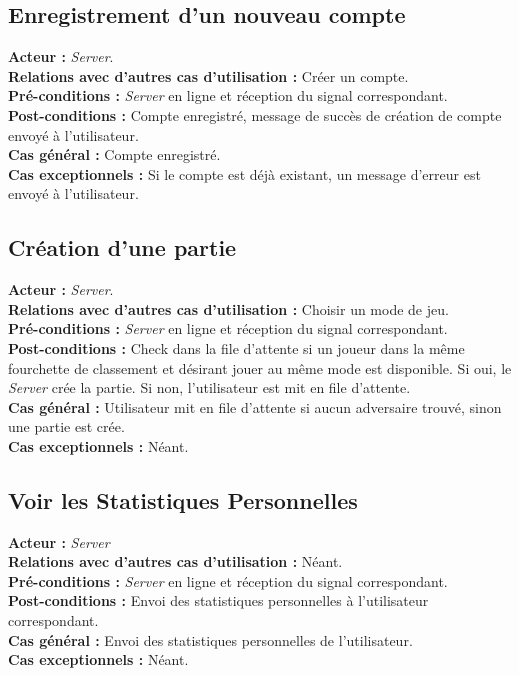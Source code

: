 \documentclass[10pt, a4paper]{article}
\begin{document}
\subsection{Enregistrement d'un nouveau compte}
\textbf{Acteur :} \textit{Server}. \\
\textbf{Relations avec d'autres cas d'utilisation :} Créer un compte. \\
\textbf{Pré-conditions :} \textit{Server} en ligne et réception du signal correspondant. \\
\textbf{Post-conditions :} Compte enregistré, message de succès de création de compte envoyé à l'utilisateur. \\
\textbf{Cas général :} Compte enregistré. \\
\textbf{Cas exceptionnels :} Si le compte est déjà existant, un message d'erreur est envoyé à l'utilisateur. \\

\subsection{Création d'une partie}
\textbf{Acteur :} \textit{Server}. \\
\textbf{Relations avec d'autres cas d'utilisation :} Choisir un mode de jeu. \\
\textbf{Pré-conditions :} \textit{Server} en ligne et réception du signal correspondant. \\
\textbf{Post-conditions :} Check dans la file d'attente si un joueur dans la même fourchette de classement et désirant jouer au même mode est disponible. Si oui, le \textit{Server} crée la partie. Si non, l'utilisateur est mit en file d'attente. \\
\textbf{Cas général :} Utilisateur mit en file d'attente si aucun adversaire trouvé, sinon une partie est crée. \\
\textbf{Cas exceptionnels :} Néant. \\

\subsection{Voir les Statistiques Personnelles}
\textbf{Acteur :} \textit{Server} \\
\textbf{Relations avec d'autres cas d'utilisation :} Néant. \\
\textbf{Pré-conditions :} \textit{Server} en ligne et réception du signal correspondant. \\
\textbf{Post-conditions :} Envoi des statistiques personnelles à l'utilisateur correspondant. \\
\textbf{Cas général :} Envoi des statistiques personnelles de l'utilisateur. \\
\textbf{Cas exceptionnels :} Néant. \\
\end{document}
